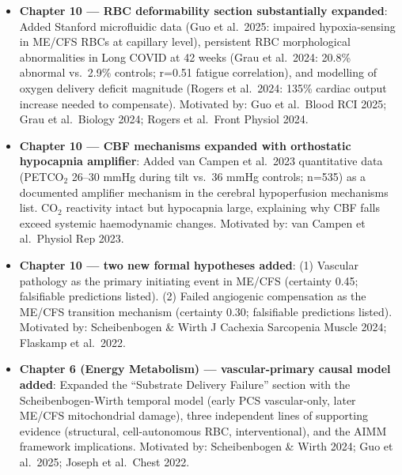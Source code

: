 \begin{itemize}
\begin{itemize}
      \item \textbf{Chapter 10 --- RBC deformability section substantially expanded}:
        Added Stanford microfluidic data (Guo et al.\ 2025: impaired hypoxia-sensing in ME/CFS RBCs at
        capillary level), persistent RBC morphological abnormalities in Long COVID at 42 weeks (Grau et al.\
        2024: 20.8\% abnormal vs.\ 2.9\% controls; r=0.51 fatigue correlation), and modelling of oxygen
        delivery deficit magnitude (Rogers et al.\ 2024: 135\% cardiac output increase needed to compensate).
        Motivated by: Guo et al.\ Blood RCI 2025; Grau et al.\ Biology 2024; Rogers et al.\ Front Physiol 2024.
        \cite{GuoRBC2025microfluidic, GrauRBC2024longcovid, RogersRBC2024covidoxygen}

      \item \textbf{Chapter 10 --- CBF mechanisms expanded with orthostatic hypocapnia amplifier}:
        Added van Campen et al.\ 2023 quantitative data (PETCO$_2$ 26--30 mmHg during tilt vs.\ 36 mmHg controls;
        n=535) as a documented amplifier mechanism in the cerebral hypoperfusion mechanisms list. CO$_2$ reactivity
        intact but hypocapnia large, explaining why CBF falls exceed systemic haemodynamic changes.
        Motivated by: van Campen et al.\ Physiol Rep 2023.
        \cite{VanCampen2023co2cbf}

      \item \textbf{Chapter 10 --- two new formal hypotheses added}:
        (1) Vascular pathology as the primary initiating event in ME/CFS (certainty 0.45; falsifiable
        predictions listed). (2) Failed angiogenic compensation as the ME/CFS transition mechanism
        (certainty 0.30; falsifiable predictions listed).
        Motivated by: Scheibenbogen \& Wirth J Cachexia Sarcopenia Muscle 2024; Flaskamp et al.\ 2022.
        \cite{ScheibenbogenWirth2024sarcopenia, Flaskamp2022endothelial}

      \item \textbf{Chapter 6 (Energy Metabolism) --- vascular-primary causal model added}:
        Expanded the ``Substrate Delivery Failure'' section with the Scheibenbogen-Wirth temporal model
        (early PCS vascular-only, later ME/CFS mitochondrial damage), three independent lines of supporting
        evidence (structural, cell-autonomous RBC, interventional), and the AIMM framework implications.
        Motivated by: Scheibenbogen \& Wirth 2024; Guo et al.\ 2025; Joseph et al.\ Chest 2022.
        \cite{ScheibenbogenWirth2024sarcopenia, GuoRBC2025microfluidic, Joseph2022pyridostigmine}


\end{itemize}
\end{itemize}

